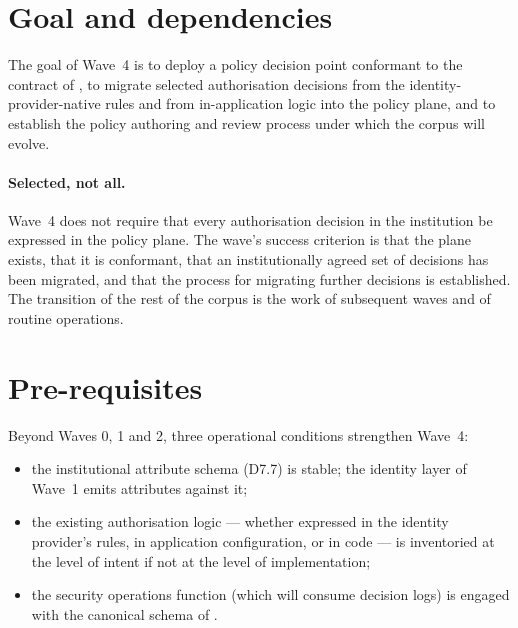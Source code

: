 \section{Goal and dependencies}
\label{sec:w4-goal}

The goal of Wave~4 is to deploy a policy decision point conformant
to the contract of , to migrate selected
authorisation decisions from the identity-provider-native rules and
from in-application logic into the policy plane, and to establish
the policy authoring and review process under which the corpus
will evolve.

\paragraph{Selected, not all.} Wave~4 does not require that every
authorisation decision in the institution be expressed in the
policy plane. The wave's success criterion is that the plane
exists, that it is conformant, that an institutionally agreed set
of decisions has been migrated, and that the process for migrating
further decisions is established. The transition of the rest of
the corpus is the work of subsequent waves and of routine
operations.

\section{Pre-requisites}
\label{sec:w4-prereq}

Beyond Waves 0, 1 and 2, three operational conditions strengthen
Wave~4:

\begin{itemize}[leftmargin=1.5em,nosep]
  \item the institutional attribute schema (D7.7) is stable; the
    identity layer of Wave~1 emits attributes against it;
  \item the existing authorisation logic --- whether expressed in
    the identity provider's rules, in application configuration,
    or in code --- is inventoried at the level of intent if not at
    the level of implementation;
  \item the security operations function (which will consume
    decision logs) is engaged with the canonical schema of
    .
\end{itemize}

